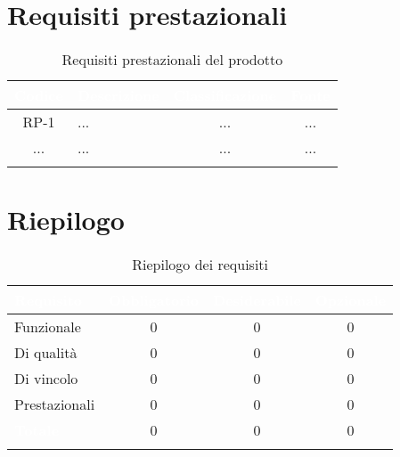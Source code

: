 \section{Requisiti prestazionali}

\begingroup
\setlength{\tabcolsep}{10pt}
\renewcommand{\arraystretch}{1.5}
\begin{xltabular}{\textwidth}{| c | X | c | c |}
    \hline
     \textbf{\textcolor{white}{Codice}} & \textbf{\textcolor{white}{Descrizione}} & \textbf{\textcolor{white}{Classificazione}} & \textbf{\textcolor{white}{Fonte}}\\
    \hline
    \endhead
    RP-1 & ... & ... & ... \\
    \hline
    ... & ... & ... & ... \\
    \hline
     \caption{Requisiti prestazionali del prodotto}
    \label{tab:reqpre}
\end{xltabular}
\endgroup

\section{Riepilogo}
\begingroup
\setlength{\tabcolsep}{10pt}
\renewcommand{\arraystretch}{1.5}
\begin{xltabular}{\textwidth}{| X | c | c | c |}
    \hline
     \textbf{\textcolor{white}{Requisito}} & \textbf{\textcolor{white}{Obbligatorio}} & \textbf{\textcolor{white}{Desiderabile}} & \textbf{\textcolor{white}{Opzionale}}\\
    \hline
    \endhead
    Funzionale & 0 & 0 & 0 \\
    \hline
    Di qualità & 0 & 0 & 0 \\
    \hline
    Di vincolo & 0 & 0 & 0 \\
    \hline
    Prestazionali & 0 & 0 & 0 \\
    \hline
     \textbf{\textcolor{white}{Totale}} & 0 & 0 & 0 \\
    \hline
    
     \caption{Riepilogo dei requisiti}
    \label{tab:riepilogo}
\end{xltabular}
\endgroup